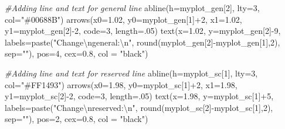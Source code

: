 \documentclass[
]{article}
\newenvironment{Shaded}{\begin{snugshade}}{\end{snugshade}}
\newcommand{\AttributeTok}[1]{\textcolor[rgb]{0.77,0.63,0.00}{#1}}
\newcommand{\CommentTok}[1]{\textcolor[rgb]{0.56,0.35,0.01}{\textit{#1}}}
\newcommand{\DecValTok}[1]{\textcolor[rgb]{0.00,0.00,0.81}{#1}}
\newcommand{\FloatTok}[1]{\textcolor[rgb]{0.00,0.00,0.81}{#1}}
\newcommand{\FunctionTok}[1]{\textcolor[rgb]{0.00,0.00,0.00}{#1}}
\newcommand{\NormalTok}[1]{#1}
\newcommand{\SpecialCharTok}[1]{\textcolor[rgb]{0.00,0.00,0.00}{#1}}
\newcommand{\StringTok}[1]{\textcolor[rgb]{0.31,0.60,0.02}{#1}}
\begin{document}
\begin{Shaded}
\begin{Highlighting}[]
\CommentTok{\#Adding line and text for general line}
\FunctionTok{abline}\NormalTok{(}\AttributeTok{h=}\NormalTok{myplot\_gen[}\DecValTok{2}\NormalTok{], }\AttributeTok{lty=}\DecValTok{3}\NormalTok{, }\AttributeTok{col=}\StringTok{"\#00688B"}\NormalTok{)}
\FunctionTok{arrows}\NormalTok{(}\AttributeTok{x0=}\FloatTok{1.02}\NormalTok{, }\AttributeTok{y0=}\NormalTok{myplot\_gen[}\DecValTok{1}\NormalTok{]}\SpecialCharTok{+}\DecValTok{2}\NormalTok{, }\AttributeTok{x1=}\FloatTok{1.02}\NormalTok{, }\AttributeTok{y1=}\NormalTok{myplot\_gen[}\DecValTok{2}\NormalTok{]}\SpecialCharTok{{-}}\DecValTok{2}\NormalTok{, }\AttributeTok{code=}\DecValTok{3}\NormalTok{, }\AttributeTok{length=}\NormalTok{.}\DecValTok{05}\NormalTok{)}
\FunctionTok{text}\NormalTok{(}\AttributeTok{x=}\FloatTok{1.02}\NormalTok{, }\AttributeTok{y=}\NormalTok{myplot\_gen[}\DecValTok{2}\NormalTok{]}\SpecialCharTok{{-}}\DecValTok{9}\NormalTok{,  }\AttributeTok{labels=}\FunctionTok{paste}\NormalTok{(}\StringTok{"Change}\SpecialCharTok{\textbackslash{}n}\StringTok{general:}\SpecialCharTok{\textbackslash{}n}\StringTok{"}\NormalTok{, }\FunctionTok{round}\NormalTok{(myplot\_gen[}\DecValTok{2}\NormalTok{]}\SpecialCharTok{{-}}\NormalTok{myplot\_gen[}\DecValTok{1}\NormalTok{],}\DecValTok{2}\NormalTok{), }\AttributeTok{sep=}\StringTok{""}\NormalTok{), }\AttributeTok{pos=}\DecValTok{4}\NormalTok{, }\AttributeTok{cex=}\FloatTok{0.8}\NormalTok{, }\AttributeTok{col =} \StringTok{"black"}\NormalTok{)}

\CommentTok{\#Adding line and text for reserved line}
\FunctionTok{abline}\NormalTok{(}\AttributeTok{h=}\NormalTok{myplot\_sc[}\DecValTok{1}\NormalTok{], }\AttributeTok{lty=}\DecValTok{3}\NormalTok{, }\AttributeTok{col=}\StringTok{"\#FF1493"}\NormalTok{)}
\FunctionTok{arrows}\NormalTok{(}\AttributeTok{x0=}\FloatTok{1.98}\NormalTok{, }\AttributeTok{y0=}\NormalTok{myplot\_sc[}\DecValTok{1}\NormalTok{]}\SpecialCharTok{+}\DecValTok{2}\NormalTok{, }\AttributeTok{x1=}\FloatTok{1.98}\NormalTok{, }\AttributeTok{y1=}\NormalTok{myplot\_sc[}\DecValTok{2}\NormalTok{]}\SpecialCharTok{{-}}\DecValTok{2}\NormalTok{, }\AttributeTok{code=}\DecValTok{3}\NormalTok{, }\AttributeTok{length=}\NormalTok{.}\DecValTok{05}\NormalTok{)}
\FunctionTok{text}\NormalTok{(}\AttributeTok{x=}\FloatTok{1.98}\NormalTok{, }\AttributeTok{y=}\NormalTok{myplot\_sc[}\DecValTok{1}\NormalTok{]}\SpecialCharTok{+}\DecValTok{5}\NormalTok{,  }\AttributeTok{labels=}\FunctionTok{paste}\NormalTok{(}\StringTok{"Change}\SpecialCharTok{\textbackslash{}n}\StringTok{reserved:}\SpecialCharTok{\textbackslash{}n}\StringTok{"}\NormalTok{, }\FunctionTok{round}\NormalTok{(myplot\_sc[}\DecValTok{2}\NormalTok{]}\SpecialCharTok{{-}}\NormalTok{myplot\_sc[}\DecValTok{1}\NormalTok{],}\DecValTok{2}\NormalTok{), }\AttributeTok{sep=}\StringTok{""}\NormalTok{), }\AttributeTok{pos=}\DecValTok{2}\NormalTok{, }\AttributeTok{cex=}\FloatTok{0.8}\NormalTok{, }\AttributeTok{col =} \StringTok{"black"}\NormalTok{)}


\end{Highlighting}
\end{Shaded}
\end{document}
